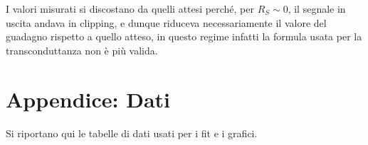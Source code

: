\documentclass[10pt,a4paper]{article}
\begin{document}
I valori misurati si discostano da quelli attesi perché, per $R_S \sim 0$, il segnale in uscita andava in clipping, e dunque riduceva necessariamente il valore del guadagno rispetto a quello atteso, in questo regime infatti la formula usata per la transconduttanza non è più valida.

\pagebreak
\section{Appendice: Dati}
Si riportano qui le tabelle di dati usati per i fit e i grafici.

\centering
\begin{figure}[h!]
	\begin{minipage}[t]{0.33\textwidth}
		\centering
		\resizebox{1\textwidth}{!}{
		}
		\label{njfet}
	\end{minipage}
	\begin{minipage}[t]{0.33\textwidth}
		\resizebox{1\textwidth}{!}{
		}
		\label{tab:commonsource}
	\end{minipage}
	\begin{minipage}[t]{0.32\textwidth}
		\centering
		\resizebox{1\textwidth}{!}{
		}
		\label{tab:sourcefollower}
	\end{minipage}
\end{figure}
\end{document}
